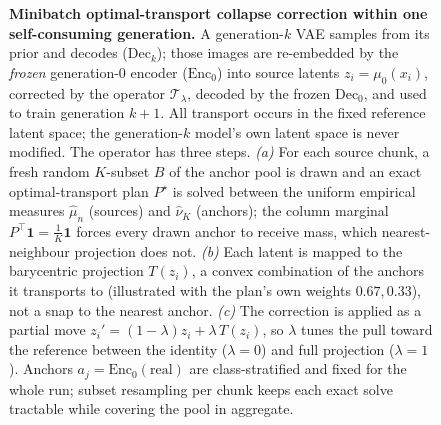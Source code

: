 %
%
%
\begin{figure}[t]
  \centering
  \resizebox{\textwidth}{!}{}
  \caption{%
    \textbf{Minibatch optimal-transport collapse correction within one
    self-consuming generation.}
    A generation-$k$ VAE samples from its prior and decodes ($\mathrm{Dec}_k$);
    those images are re-embedded by the \emph{frozen} generation-0 encoder
    ($\mathrm{Enc}_0$) into source latents $z_i=\mu_0(x_i)$, corrected by the
    operator $\mathcal T_\lambda$, decoded by the frozen $\mathrm{Dec}_0$, and used
    to train generation $k{+}1$. All transport occurs in the fixed reference
    latent space; the generation-$k$ model's own latent space is never modified.
    The operator has three steps.
    \emph{(a)} For each source chunk, a fresh random $K$-subset
    $B$ of the anchor pool is drawn and an exact optimal-transport plan
    $P^\star$ is solved between the uniform empirical measures $\hat\mu_n$ (sources)
    and $\hat\nu_K$ (anchors); the column marginal
    $P^{\!\top}\mathbf 1=\tfrac1K\mathbf 1$ forces every drawn anchor to receive
    mass, which nearest-neighbour projection does not.
    \emph{(b)} Each latent is mapped to the barycentric projection $T(z_i)$, a
    convex combination of the anchors it transports to (illustrated with the
    plan's own weights $0.67,0.33$), not a snap to the nearest anchor.
    \emph{(c)} The correction is applied as a partial move
    $z_i'=(1-\lambda)z_i+\lambda\,T(z_i)$, so $\lambda$ tunes the pull toward the
    reference between the identity ($\lambda{=}0$) and full projection
    ($\lambda{=}1$).
    Anchors $a_j=\mathrm{Enc}_0(\text{real})$ are class-stratified and fixed for
    the whole run; subset resampling per chunk keeps each exact solve tractable
    while covering the pool in aggregate.}
  \label{fig:ot-pipeline}
\end{figure}
